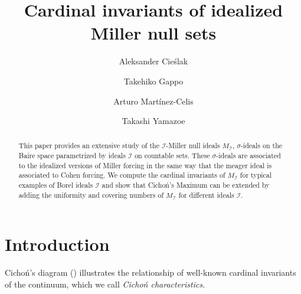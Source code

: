 \documentclass[a4paper,12pt]{amsart}
\title{Cardinal invariants of idealized Miller null sets}
\author{Aleksander Cieślak}
\author{Takehiko Gappo}
\author{Arturo Martínez-Celis}
\author{Takashi Yamazoe}
\theoremstyle{definition}
\numberwithin{thm}{section}
\numberwithin{equation}{section}
\newcommand{\I}{\mathscr{I}}
\begin{document}
	
    \begin{abstract}
        This paper provides an extensive study of the $\I$-Miller null ideals $M_\I$, $\sigma$-ideals on the Baire space parametrized by ideals $\I$ on countable sets. These $\sigma$-ideals are associated to the idealized versions of Miller forcing in the same way that the meager ideal is associated to Cohen forcing. We compute the cardinal invariants of $M_\I$ for typical examples of Borel ideals $\I$ and show that Cicho\'{n}'s Maximum can be extended by adding the uniformity and covering numbers of $M_\I$ for different ideals $\I$.
    \end{abstract}
	
    \maketitle

    \tableofcontents

    \section{Introduction}

    Cicho\'n's diagram () illustrates the relationship of well-known cardinal invariants of the continuum, which we call \emph{Cicho\'n characteristics}.
\end{document}
